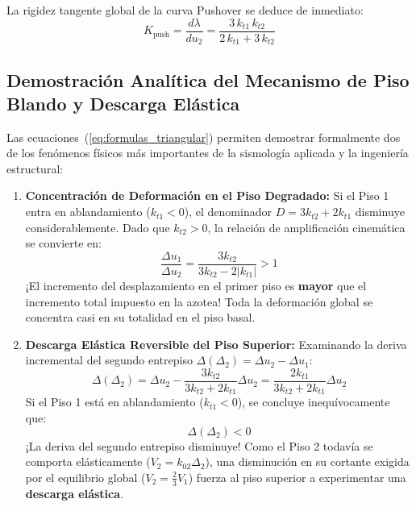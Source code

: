 \documentclass[11pt,letterpaper]{article}
\begin{document}
La rigidez tangente global de la curva Pushover se deduce de inmediato:
\begin{equation}
    \label{eq:kpush_formula}
    K_{\text{push}} = \frac{d\lambda}{du_2} = \frac{3 \, k_{t1} \, k_{t2}}{2 \, k_{t1} + 3 \, k_{t2}}
\end{equation}

\subsection{Demostración Analítica del Mecanismo de Piso Blando y Descarga Elástica}

Las ecuaciones~(\ref{eq:formulas_triangular}) permiten demostrar formalmente dos de los fenómenos físicos más importantes de la sismología aplicada y la ingeniería estructural:

\begin{enumerate}
    \item \textbf{Concentración de Deformación en el Piso Degradado:}
    Si el Piso 1 entra en ablandamiento ($k_{t1} < 0$), el denominador $D = 3 k_{t2} + 2 k_{t1}$ disminuye considerablemente. Dado que $k_{t2} > 0$, la relación de amplificación cinemática se convierte en:
    \begin{equation}
        \frac{\Delta u_1}{\Delta u_2} = \frac{3 k_{t2}}{3 k_{t2} - 2 |k_{t1}|} > 1
    \end{equation}
    ¡El incremento del desplazamiento en el primer piso es \textbf{mayor} que el incremento total impuesto en la azotea! Toda la deformación global se concentra casi en su totalidad en el piso basal.

    \item \textbf{Descarga Elástica Reversible del Piso Superior:}
    Examinando la deriva incremental del segundo entrepiso $\Delta(\Delta_2) = \Delta u_2 - \Delta u_1$:
    \begin{equation}
        \Delta(\Delta_2) = \Delta u_2 - \frac{3 k_{t2}}{3 k_{t2} + 2 k_{t1}} \Delta u_2 = \frac{2 k_{t1}}{3 k_{t2} + 2 k_{t1}} \Delta u_2
    \end{equation}
    Si el Piso 1 está en ablandamiento ($k_{t1} < 0$), se concluye inequívocamente que:
    \begin{equation}
        \Delta(\Delta_2) < 0
    \end{equation}
    ¡La deriva del segundo entrepiso disminuye! Como el Piso 2 todavía se comporta elásticamente ($V_2 = k_{02} \Delta_2$), una disminución en su cortante exigida por el equilibrio global ($V_2 = \frac{2}{3} V_1$) fuerza al piso superior a experimentar una \textbf{descarga elástica}.
\end{enumerate}
\end{document}
